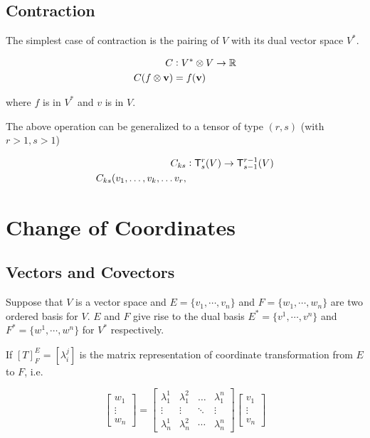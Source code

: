 \subsection{Contraction}


The simplest case of contraction is the  pairing of $V$ with
its dual vector space $V^*$. 

\begin{align}
 C &:  V^* \otimes V \rightarrow \mathbb{R} \\
C(f \otimes \mathbf{ v})&= f(\mathbf{ v})
\end{align}

where $f$ is in $V^*$ and $v$ is in
$V$. 


The above operation can be generalized to  a tensor of type $(r,s)$ (with $r>1,s>1$)

\begin{align}
C_{ks}&: \mathsf{T}^r_s(V)\to \mathsf{T}^{r-1}_{s-1}(V) \\
C_{ks}(v_1,\dots, v_k, \dots v_r, &
\end{align}








\section{Change of Coordinates}

\subsection{ Vectors and Covectors}



Suppose that $V$ is a vector space and $E=\{v_1,\cdots,v_n\}$ and $F = \{w_1,\cdots,w_n\}$ are two ordered basis for $V$. $E$ and $F$ give rise to the dual basis $E^*=\{v^1,\cdots,v^n\}$ and $F^*=\{w^1,\cdots,w^n\}$ for $V^*$ respectively. 

If $[T]_{F}^{E}=[\lambda_{i}^{j}]$ is the matrix representation of coordinate transformation from $E$ to $F$, i.e. 

$$\begin{bmatrix} w_1 \\ \vdots \\ w_n \end{bmatrix}= \begin{bmatrix} \lambda_1^1 & \lambda_1^2 & \dots &\lambda_1^n \\ \vdots & \vdots & \ddots & \vdots \\ \lambda_n^1 & \lambda_n^2 & \cdots & \lambda_n^n\end{bmatrix} \begin{bmatrix} v_1 \\ \vdots \\ v_n \end{bmatrix}$$

